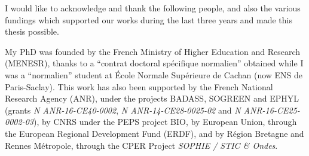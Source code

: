 
\begin{acknowledgements}

\vspace*{-20pt}

I would like to acknowledge and thank the following people, and also the various fundings which supported our works during the last three years and made this thesis possible.

My PhD was founded by the French Ministry of Higher Education and Research (MENESR),
thanks to a ``contrat doctoral spécifique normalien'' obtained while I was a ``normalien'' student at \'Ecole Normale Sup\'erieure de Cachan (now ENS de Paris-Saclay).
This work has also been supported by
the French National Research Agency (ANR), under the projects BADASS, SOGREEN and EPHYL (grants \emph{N ANR-16-CE40-0002}, \emph{N ANR-14-CE28-0025-02} and \emph{N ANR-16-CE25-0002-03}),
by CNRS under the PEPS project BIO,
by European Union, through the European Regional Development Fund (ERDF),
and by R\'egion Bretagne and Rennes Métropole, through the CPER Project \emph{SOPHIE / STIC \& Ondes}.


\end{acknowledgements}
